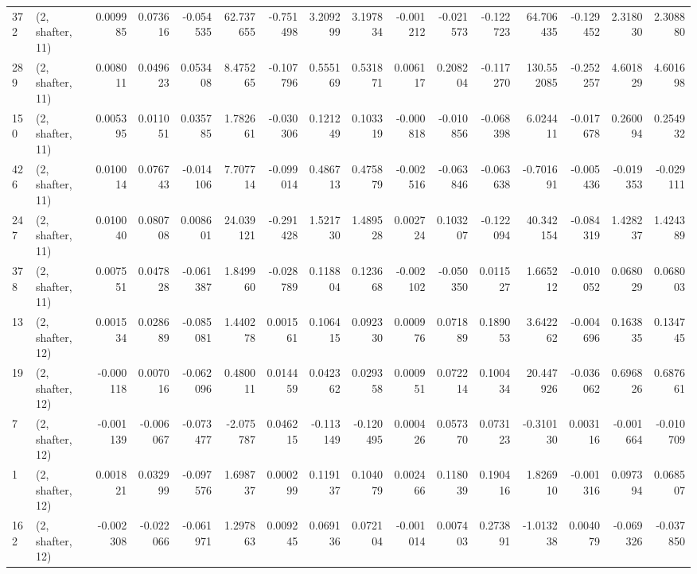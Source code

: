 \begin{tabular}{llrrrrrrrrrrrrrr}
372 &  (2, shafter, 11) &   0.009985 &  0.073616 & -0.054535 &   62.737655 & -0.751498 &   3.209299 &  3.197834 & -0.001212 & -0.021573 & -0.122723 &   64.706435 & -0.129452 &  2.318030 &  2.308880 \\
289 &  (2, shafter, 11) &   0.008011 &  0.049623 &  0.053408 &    8.475265 & -0.107796 &   0.555169 &  0.531871 &  0.006117 &  0.208204 & -0.117270 &  130.552085 & -0.252257 &  4.601829 &  4.601698 \\
150 &  (2, shafter, 11) &   0.005395 &  0.011051 &  0.035785 &    1.782661 & -0.030306 &   0.121249 &  0.103319 & -0.000818 & -0.010856 & -0.068398 &    6.024411 & -0.017678 &  0.260094 &  0.254932 \\
426 &  (2, shafter, 11) &   0.010014 &  0.076743 & -0.014106 &    7.707714 & -0.099014 &   0.486713 &  0.475879 & -0.002516 & -0.063846 & -0.063638 &   -0.701691 & -0.005436 & -0.019353 & -0.029111 \\
247 &  (2, shafter, 11) &   0.010040 &  0.080708 &  0.008601 &   24.039121 & -0.291428 &   1.521730 &  1.489528 &  0.002724 &  0.103207 & -0.122094 &   40.342154 & -0.084319 &  1.428237 &  1.424389 \\
378 &  (2, shafter, 11) &   0.007551 &  0.047828 & -0.061387 &    1.849960 & -0.028789 &   0.118804 &  0.123668 & -0.002102 & -0.050350 &  0.011527 &    1.665212 & -0.010052 &  0.068029 &  0.068003 \\
13  &  (2, shafter, 12) &   0.001534 &  0.028689 & -0.085081 &    1.440278 &  0.001561 &   0.106415 &  0.092330 &  0.000976 &  0.071889 &  0.189053 &    3.642262 & -0.004696 &  0.163835 &  0.134745 \\
19  &  (2, shafter, 12) &  -0.000118 &  0.007016 & -0.062096 &    0.480011 &  0.014459 &   0.042362 &  0.029358 &  0.000951 &  0.072214 &  0.100434 &   20.447926 & -0.036062 &  0.696826 &  0.687661 \\
7   &  (2, shafter, 12) &  -0.001139 & -0.006067 & -0.073477 &   -2.075787 &  0.046215 &  -0.113149 & -0.120495 &  0.000426 &  0.057370 &  0.073123 &   -0.310130 &  0.003116 & -0.001664 & -0.010709 \\
1   &  (2, shafter, 12) &   0.001821 &  0.032999 & -0.097576 &    1.698737 &  0.000299 &   0.119137 &  0.104079 &  0.002466 &  0.118039 &  0.190416 &    1.826910 & -0.001316 &  0.097394 &  0.068507 \\
162 &  (2, shafter, 12) &  -0.002308 & -0.022066 & -0.061971 &    1.297863 &  0.009245 &   0.069136 &  0.072104 & -0.001014 &  0.007403 &  0.273891 &   -1.013238 &  0.004079 & -0.069326 & -0.037850 \\

\end{tabular}
